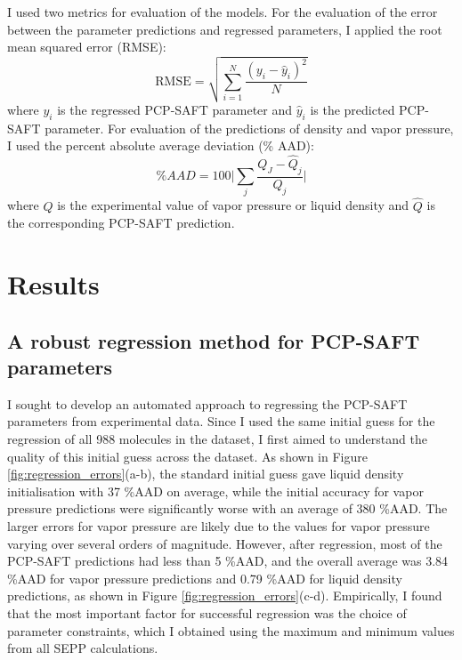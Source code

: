 I used two metrics for evaluation of the models. For the evaluation of the error between the parameter predictions and regressed parameters, I applied the root mean squared error (RMSE):
\begin{equation}
    \text{RMSE} = \sqrt{\sum_{i=1}^N \frac{(y_i - \hat y_i)^2}{N}}
\end{equation}
where $y_i$ is the regressed PCP-SAFT parameter and $\hat y_i$ is the predicted PCP-SAFT parameter. For evaluation of the predictions of density and vapor pressure, I used the percent absolute average deviation (\% AAD):
\begin{equation}
    \% AAD = 100 \biggl \vert \sum_j\frac{Q_J - \hat Q_j}{Q_j} \biggr \vert  
\end{equation}
where $Q$ is the experimental value of vapor pressure or liquid density and $\hat Q$ is the corresponding PCP-SAFT prediction.

\section{Results}

\subsection{A robust regression method for PCP-SAFT parameters}

I sought to develop an automated approach to regressing the PCP-SAFT parameters from experimental data. Since I used the same initial guess for the regression of all 988 molecules in the dataset, I first aimed to understand the quality of this initial guess across the dataset. As shown in Figure \ref{fig:regression_errors}(a-b), the standard initial guess gave liquid density initialisation with 37 \%AAD on average, while the initial accuracy for vapor pressure predictions were significantly worse with an average of 380 \%AAD. The larger errors for vapor pressure are likely due to the values for vapor pressure varying over several orders of magnitude. However, after regression, most of the PCP-SAFT predictions had less than 5 \%AAD, and the overall average was 3.84 \%AAD for vapor pressure predictions and 0.79 \%AAD for liquid density predictions, as shown in Figure \ref{fig:regression_errors}(c-d). Empirically, I found that the most important factor for successful regression was the choice of parameter constraints, which I obtained using the maximum and minimum values from all SEPP calculations.

